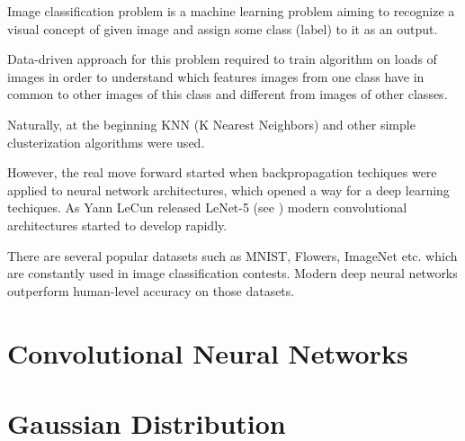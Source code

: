 Image classification problem is a machine learning problem aiming to recognize a visual concept of given image and assign some class (label) to it as an output.

Data-driven approach for this problem required to train algorithm on loads of images in order to understand which features images from one class have in common to other images of this class and different from images of other classes.

Naturally, at the beginning KNN (K Nearest Neighbors) and other simple clusterization algorithms were used.

However, the real move forward started when backpropagation techiques were applied to neural network architectures, which opened a way for a deep learning techiques. As Yann LeCun released LeNet-5  (see \cite{lecun-89c}) modern convolutional architectures started to develop rapidly.

There are several popular datasets such as MNIST, Flowers, ImageNet etc. which are constantly used in image classification contests. Modern deep neural networks outperform human-level accuracy on those datasets.

\section{Convolutional Neural Networks}
\section{Gaussian Distribution}




